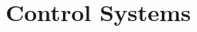 \documentclass[  10pt, twoside]{report} %
\numberwithin{equation}{chapter}
\begin{document}


\section{Control Systems}
\end{document}
